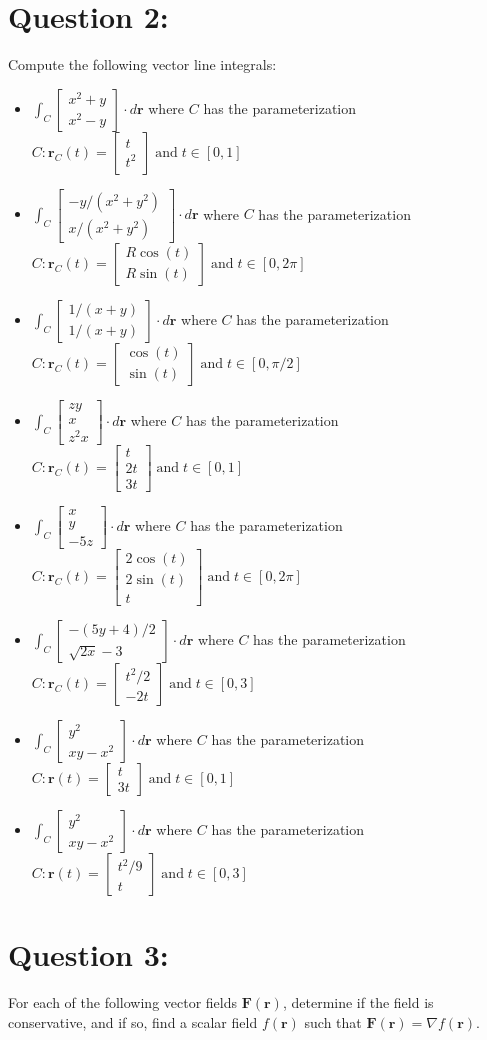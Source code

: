 \documentclass{article}
\newcommand{\colxyvec}[2]{\begin{bmatrix} #1 \\ #2 \end{bmatrix}}
\newcommand{\colvec}[3]{\begin{bmatrix} #1 \\ #2 \\ #3 \end{bmatrix}}
\begin{document}
\section*{Question 2:}

Compute the following vector line integrals:

\begin{itemize}
\item \(\int_C \colxyvec{x^2 + y}{x^2 - y} \cdot d\mathbf{r}\) where \(C\) has the parameterization \(C: \mathbf{r}_C(t) = \colxyvec{t}{t^2} \;\text{and}\; t \in [0,1]\)
\item \(\int_C \colxyvec{-y/(x^2 + y^2)}{x/(x^2 + y^2)} \cdot d\mathbf{r}\) where \(C\) has the parameterization \(C: \mathbf{r}_C(t) = \colxyvec{R\cos(t)}{R\sin(t)} \;\text{and}\; t \in [0, 2\pi]\)
\item \(\int_C \colxyvec{1/(x+y)}{1/(x+y)} \cdot d\mathbf{r}\) where \(C\) has the parameterization \(C: \mathbf{r}_C(t) = \colxyvec{\cos(t)}{\sin(t)} \;\text{and}\; t \in [0,\pi/2]\)
\item \(\int_C \colvec{zy}{x}{z^2x} \cdot d\mathbf{r}\) where \(C\) has the parameterization \(C: \mathbf{r}_C(t) = \colvec{t}{2t}{3t} \;\text{and}\; t \in [0,1]\)
\item \(\int_C \colvec{x}{y}{-5z} \cdot d\mathbf{r}\) where \(C\) has the parameterization \(C: \mathbf{r}_C(t) = \colvec{2\cos(t)}{2\sin(t)}{t} \;\text{and}\; t \in [0,2\pi]\)
\item \(\int_C \colxyvec{-(5y + 4)/2}{\sqrt{2x} - 3} \cdot d\mathbf{r}\) where \(C\) has the parameterization \(C: \mathbf{r}_C(t) = \colxyvec{t^2 / 2}{-2t} \;\text{and}\; t \in [0,3]\)
\item \(\int_C \colxyvec{y^2}{xy - x^2} \cdot d\mathbf{r}\) where \(C\) has the parameterization \(C: \mathbf{r}(t) = \colxyvec{t}{3t} \;\text{and}\; t \in [0,1]\)
\item \(\int_C \colxyvec{y^2}{xy - x^2} \cdot d\mathbf{r}\) where \(C\) has the parameterization \(C: \mathbf{r}(t) = \colxyvec{t^2/9}{t} \;\text{and}\; t \in [0,3]\)
\end{itemize}



\section*{Question 3:}

For each of the following vector fields \(\mathbf{F}(\mathbf{r})\), determine if the field is conservative, and if so, find a scalar field \(f(\mathbf{r})\) such that \(\mathbf{F}(\mathbf{r}) = \nabla f(\mathbf{r})\). 
\end{document}
